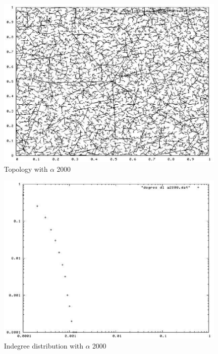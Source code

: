 \documentclass[a4paper,12pt]{article}
\begin{document}
\begin{figure}
\begin{center}
\includegraphics[scale=0.6]{pic_alfa2000.eps}
\end{center}
\caption{Topology with $\alpha$ 2000\label{t2000figure}}
\end{figure}

\begin{figure}
\begin{center}
\includegraphics[scale=0.6]{picdegree_alfa2000.eps}
\end{center}
\caption{Indegree distribution with $\alpha$ 2000\label{d2000figure}}
\end{figure}
\end{document}
